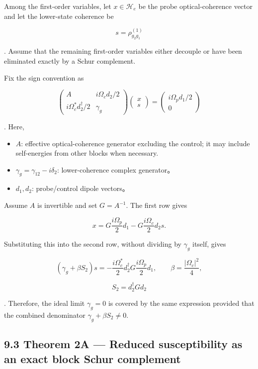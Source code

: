 \documentclass[
  10pt,
  a4paper,
]{article}
\providecommand{\tightlist}{%
  \setlength{\itemsep}{0pt}\setlength{\parskip}{0pt}}
\begin{document}
Among the first-order variables, let \(x\in\mathcal H_e\) be the probe
optical-coherence vector and let the lower-state coherence be

\[
s=\rho_{g_2g_1}^{(1)}
\]

. Assume that the remaining first-order variables either decouple or
have been eliminated exactly by a Schur complement.

Fix the sign convention as

\[
\begin{pmatrix}
A & i\Omega_c d_2/2\\
i\Omega_c^*d_2^\dagger/2 & \gamma_g
\end{pmatrix}
\begin{pmatrix}x\\s\end{pmatrix}
=
\begin{pmatrix}i\Omega_p d_1/2\\0\end{pmatrix}
\]

. Here,

\begin{itemize}
\tightlist
\item
  \(A\): effective optical-coherence generator excluding the control; it
  may include self-energies from other blocks when necessary.
\item
  \(\gamma_g=\gamma_{12}-i\delta_2\): lower-coherence complex
  generator。
\item
  \(d_1,d_2\): probe/control dipole vectors。
\end{itemize}

Assume \(A\) is invertible and set \(G=A^{-1}\). The first row gives

\[
x
=G\frac{i\Omega_p}{2}d_1
-G\frac{i\Omega_c}{2}d_2s.
\]

Substituting this into the second row, without dividing by \(\gamma_g\)
itself, gives

\[
\left(\gamma_g+\beta S_2\right)s
=-\frac{i\Omega_c^*}{2}
 d_2^\dagger G\frac{i\Omega_p}{2}d_1,
\qquad
\beta=\frac{|\Omega_c|^2}{4},
\]

\[
S_2=d_2^\dagger Gd_2
\]

. Therefore, the ideal limit \(\gamma_g=0\) is covered by the same
expression provided that the combined denominator
\(\gamma_g+\beta S_2\neq0\).

\subsection{9.3 Theorem 2A --- Reduced susceptibility as an exact block
Schur
complement}\label{theorem-2a-reduced-susceptibility-as-an-exact-block-schur-complement}
\end{document}
